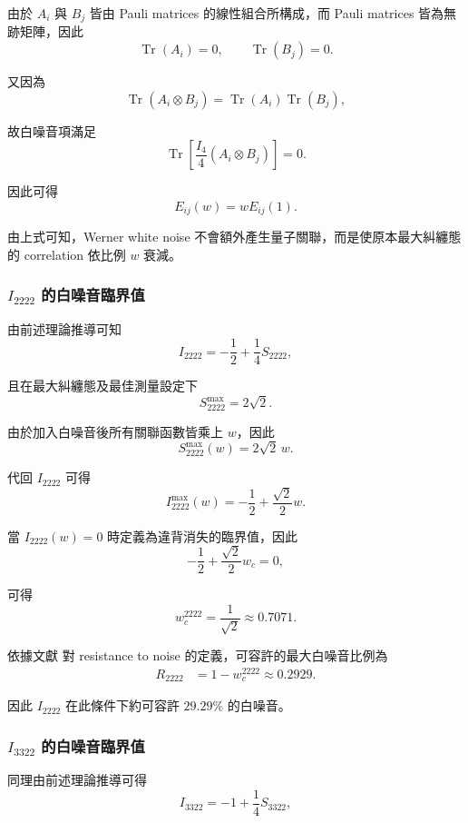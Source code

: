 \documentclass[12pt, a4paper, twoside, reqno]{article}
\begin{document}
\noindent 由於 $A_i$ 與 $B_j$ 皆由 Pauli matrices 的線性組合所構成，而 Pauli matrices 皆為無跡矩陣，因此
\[
\operatorname{Tr}(A_i)=0,
\qquad
\operatorname{Tr}(B_j)=0.
\]

\noindent 又因為
\[
\operatorname{Tr}(A_i\otimes B_j)
=
\operatorname{Tr}(A_i)\operatorname{Tr}(B_j),
\]

\noindent 故白噪音項滿足
\[
\operatorname{Tr}
\left[
\frac{I_4}{4}(A_i\otimes B_j)
\right]
=0.
\]

\noindent 因此可得
\begin{equation}
E_{ij}(w)=wE_{ij}(1).
\end{equation}

\noindent 由上式可知，Werner white noise 不會額外產生量子關聯，而是使原本最大糾纏態的 correlation 依比例 $w$ 衰減。

\subsubsection{\texorpdfstring{$I_{2222}$}{I2222} 的白噪音臨界值}
由前述理論推導可知
\[
I_{2222}
=
-\frac{1}{2}+\frac{1}{4}S_{2222},
\]

\noindent 且在最大糾纏態及最佳測量設定下
\[
S_{2222}^{\max}=2\sqrt{2}.
\]

\noindent 由於加入白噪音後所有關聯函數皆乘上 $w$，因此
\[
S_{2222}^{\max}(w)=2\sqrt{2}\,w.
\]

\noindent 代回 $I_{2222}$ 可得
\begin{equation}
I_{2222}^{\max}(w)
=
-\frac{1}{2}
+
\frac{\sqrt{2}}{2}w.
\end{equation}

\noindent 當 $I_{2222}(w)=0$ 時定義為違背消失的臨界值，因此
\[
-\frac{1}{2}
+
\frac{\sqrt{2}}{2}w_c
=0,
\]

\noindent 可得
\begin{equation}
w_c^{2222}
=
\frac{1}{\sqrt{2}}
\approx 0.7071.
\end{equation}

\noindent 依據文獻 \cite{Brunner2008} 對 resistance to noise 的定義，可容許的最大白噪音比例為
\begin{equation}
\begin{aligned}
R_{2222}
&=
1-w_c^{2222}\approx 0.2929.
\end{aligned}
\end{equation}

\noindent 因此 $I_{2222}$ 在此條件下約可容許 $29.29\%$ 的白噪音。

\subsubsection{\texorpdfstring{$I_{3322}$}{I3322} 的白噪音臨界值}
同理由前述理論推導可得
\[
I_{3322}
=
-1+\frac{1}{4}S_{3322},
\]
\end{document}
